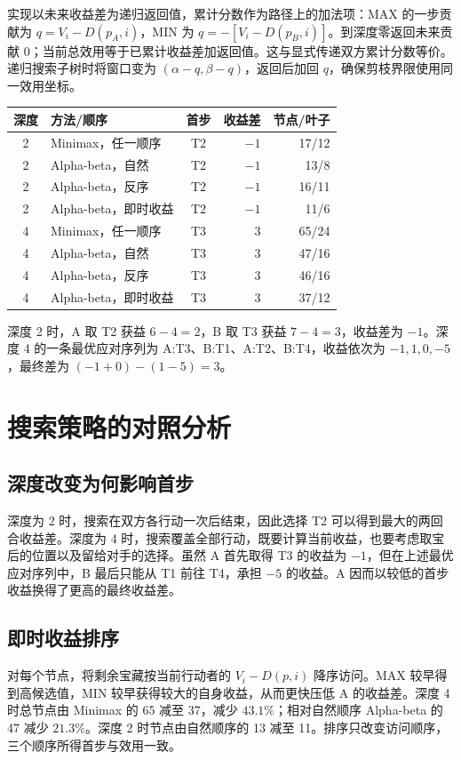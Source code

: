 \documentclass[UTF8,a4paper,zihao=5]{ctexart}
\begin{document}
实现以未来收益差为递归返回值，累计分数作为路径上的加法项：MAX 的一步贡献为 $q=V_i-D(p_A,i)$，MIN 为 $q=-[V_i-D(p_B,i)]$。到深度零返回未来贡献 0；当前总效用等于已累计收益差加返回值。这与显式传递双方累计分数等价。递归搜索子树时将窗口变为 $(\alpha-q,\beta-q)$，返回后加回 $q$，确保剪枝界限使用同一效用坐标。
\begin{center}
\begin{tabular}{clcrr}\toprule
深度 & 方法/顺序 & 首步 & 收益差 & 节点/叶子\\\midrule
2 & Minimax，任一顺序 &T2&$-1$&17/12\\
2 & Alpha-beta，自然 &T2&$-1$&13/8\\
2 & Alpha-beta，反序 &T2&$-1$&16/11\\
2 & Alpha-beta，即时收益 &T2&$-1$&11/6\\\midrule
4 & Minimax，任一顺序 &T3&3&65/24\\
4 & Alpha-beta，自然 &T3&3&47/16\\
4 & Alpha-beta，反序 &T3&3&46/16\\
4 & Alpha-beta，即时收益 &T3&3&37/12\\\bottomrule
\end{tabular}
\end{center}
深度 2 时，A 取 T2 获益 $6-4=2$，B 取 T3 获益 $7-4=3$，收益差为 $-1$。深度 4 的一条最优应对序列为 A:T3、B:T1、A:T2、B:T4，收益依次为 $-1,1,0,-5$，最终差为 $(-1+0)-(1-5)=3$。

\section{搜索策略的对照分析}
\subsection{深度改变为何影响首步}
深度为 2 时，搜索在双方各行动一次后结束，因此选择 T2 可以得到最大的两回合收益差。深度为 4 时，搜索覆盖全部行动，既要计算当前收益，也要考虑取宝后的位置以及留给对手的选择。虽然 A 首先取得 T3 的收益为 $-1$，但在上述最优应对序列中，B 最后只能从 T1 前往 T4，承担 $-5$ 的收益。A 因而以较低的首步收益换得了更高的最终收益差。

\subsection{即时收益排序}
对每个节点，将剩余宝藏按当前行动者的 $V_i-D(p,i)$ 降序访问。MAX 较早得到高候选值，MIN 较早获得较大的自身收益，从而更快压低 A 的收益差。深度 4 时总节点由 Minimax 的 65 减至 37，减少 $43.1\%$；相对自然顺序 Alpha-beta 的 47 减少 $21.3\%$。深度 2 时节点由自然顺序的 13 减至 11。排序只改变访问顺序，三个顺序所得首步与效用一致。
\end{document}
